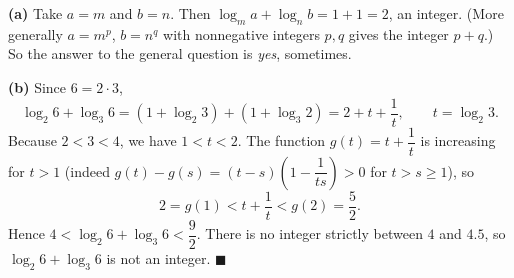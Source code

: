\textbf{(a)} Take \(a=m\) and \(b=n\). Then \(\log_m a+\log_n b=1+1=2\), an integer. (More generally \(a=m^p\), \(b=n^q\) with nonnegative integers \(p,q\) gives the integer \(p+q\).) So the answer to the general question is \emph{yes}, sometimes.

\textbf{(b)} Since \(6=2\cdot 3\),
\[
\log_2 6+\log_3 6=(1+\log_2 3)+(1+\log_3 2)=2+t+\dfrac{1}{t},\qquad t=\log_2 3 .
\]
Because \(2<3<4\), we have \(1<t<2\). The function \(g(t)=t+\dfrac{1}{t}\) is increasing for \(t>1\) (indeed \(g(t)-g(s)=(t-s)\left(1-\dfrac{1}{ts}\right)>0\) for \(t>s\ge1\)), so
\[
2=g(1)<t+\dfrac{1}{t}<g(2)=\dfrac{5}{2} .
\]
Hence \(4<\log_2 6+\log_3 6<\dfrac{9}{2}\). There is no integer strictly between \(4\) and \(4.5\), so \(\log_2 6+\log_3 6\) is not an integer. \(\blacksquare\)

